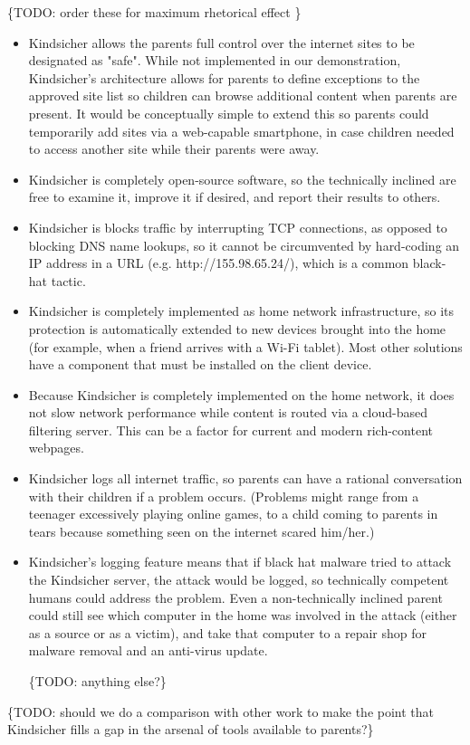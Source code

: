 \{TODO: order these for maximum rhetorical effect \}
\begin{itemize}

\item Kindsicher allows the parents full control over the internet sites to be
designated as "safe".  
%
While not implemented in our demonstration, Kindsicher's architecture allows
for parents to define exceptions to the approved site list so children can
browse additional content when parents are present.  
%
It would be conceptually simple to extend this so parents could temporarily
add sites via a web-capable smartphone, in case children needed to access
another site while their parents were away.

\item Kindsicher is completely open-source software, so the
technically inclined are free to examine it, improve it if desired,
and report their results to others.

\item Kindsicher is blocks traffic by interrupting TCP connections, as
opposed to blocking DNS name lookups, so it cannot be circumvented
by hard-coding an IP address in a URL (e.g. http://155.98.65.24/),
which is a common black-hat tactic.

\item Kindsicher is completely implemented as home network
infrastructure, so its protection is automatically extended to new
devices brought into the home (for example, when a friend arrives
with a Wi-Fi tablet). Most other solutions have a component that
must be installed on the client device.

\item Because Kindsicher is completely implemented on the home
network, it does not slow network performance while content is
routed via a cloud-based filtering server.  This can be a factor for
current and modern rich-content webpages.

\item Kindsicher logs all internet traffic, so parents can have a rational
conversation with their children if a problem occurs.  
%
(Problems might range from a teenager excessively playing online games, to a
child coming to parents in tears because something seen on the internet
scared him/her.)


\item Kindsicher's logging feature means that if black hat malware tried to
attack the Kindsicher server, the attack would be logged, so technically
competent humans could address the problem.
%
Even a non-technically inclined parent could still see which computer in the
home was involved in the attack (either as a source or as a victim), and take
that computer to a repair shop for malware removal and an anti-virus update.

\{TODO: anything else?\}

\end{itemize}

\{TODO: should we do a comparison with other work to make the point that
Kindsicher fills a gap in the arsenal of tools available to parents?\}
